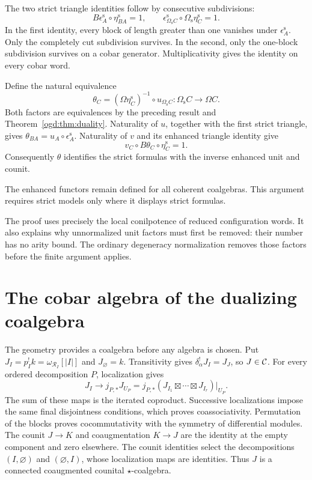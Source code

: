 The two strict triangle identities follow by consecutive subdivisions:
\[
 B\epsilon^{\mathrm s}_A\circ\eta^{\mathrm s}_{BA}=1,
 \qquad
 \epsilon^{\mathrm s}_{\Omega_{\mathrm s}C}
       \circ\Omega_{\mathrm s}\eta^{\mathrm s}_C=1.
\]
In the first identity, every block of length greater than one vanishes under $\epsilon^{\mathrm s}_A$.
Only the completely cut subdivision survives.
In the second, only the one-block subdivision survives on a cobar generator.
Multiplicativity gives the identity on every cobar word.

Define\label{ogd:def:strict-enhanced-cobar-equivalence} the natural equivalence
\[
 \theta_C=(\Omega\eta^{\mathrm s}_C)^{-1}
                 \circ u_{\Omega_{\mathrm s}C}:
 \Omega_{\mathrm s}C\longrightarrow\Omega C.
\]
Both factors are equivalences by the preceding result and Theorem~\ref{ogd:thm:duality}.
Naturality of $u$, together with the first strict triangle, gives
$\theta_{BA}=u_A\circ\epsilon^{\mathrm s}_A$.
Naturality of $v$ and its enhanced triangle identity give
\[
 v_C\circ B\theta_C\circ\eta^{\mathrm s}_C=1.
\]
Consequently $\theta$ identifies the strict formulas with the inverse enhanced unit and counit.

The enhanced functors remain defined for all coherent coalgebras.
This argument requires strict models only where it displays strict formulas.

The proof uses precisely the local conilpotence of reduced configuration words.
It also explains why unnormalized unit factors must first be removed: their number has no arity bound.
The ordinary degeneracy normalization removes those factors before the finite argument applies.

\section{The cobar algebra of the dualizing coalgebra}\label{ogd:sec:example}

The\label{ogd:def:atlas-dualizing-coalgebra} geometry provides a coalgebra before any algebra is chosen.
Put \(J_I=p_I^!k=\omega_{\mathscr R_I}[|I|]\) and \(J_\varnothing=k\).
Transitivity gives \(\delta_\alpha^!J_I=J_J\), so \(J\in\mathcal C\).
For every ordered decomposition \(P\), localization gives
\begin{equation}\label{ogd:eq:J-coprod}
 J_I\longrightarrow j_{P,*}J_{U_P}
   =j_{P,*}(J_{I_1}\boxtimes\cdots\boxtimes J_{I_r})|_{U_P}.
\end{equation}
The sum of these maps is the iterated coproduct.
Successive localizations impose the same final disjointness conditions, which proves coassociativity.
Permutation of the blocks proves cocommutativity with the symmetry of differential modules.
The counit \(J\to K\) and coaugmentation \(K\to J\) are the identity at the empty component and zero elsewhere.
The counit identities select the decompositions \((I,\varnothing)\) and \((\varnothing,I)\), whose localization maps are identities.
Thus \(J\) is a connected coaugmented counital \(\star\)-coalgebra.

